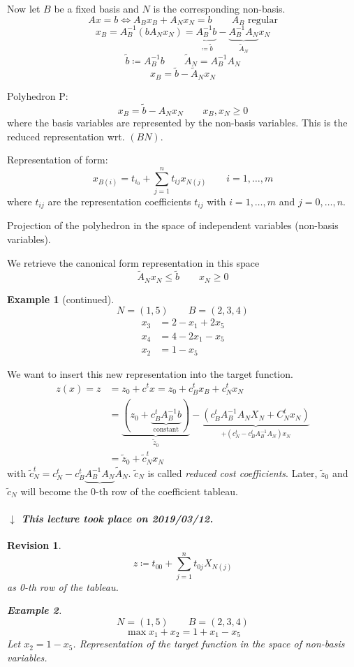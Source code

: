 \documentclass{article}
\numberwithin{lecref}{section}
\newtheorem*{Example}{Example}
\newtheorem*{Revision}{Revision}
\newcommand{\dateref}[1]{%
  \begin{mdframed}[backgroundcolor=gray!10,innerbottommargin=0pt,innertopmargin=0pt]
    \paragraph{\textit{$\downarrow$ This lecture took place on #1.}}%
  \end{mdframed}%
}
\begin{document}
Now let $B$ be a fixed basis and $N$ is the corresponding non-basis.
\[ Ax = b \iff A_B x_B + A_N x_N = b \qquad A_B \text{ regular} \]
\[ x_B = A_B^{-1} (b  A_N x_N) = \underbrace{A_B^{-1} b}_{\coloneqq \tilde b} - \underbrace{A_B^{-1} A_N}_{\tilde A_N} x_N \]
\[ \tilde b \coloneqq A_B^{-1} b \qquad \tilde A_N = A_B^{-1} A_N \]
\[ x_B = \tilde b - \tilde A_N x_N \]

Polyhedron P:
\[ x_B = \tilde b - A_N x_N \qquad x_B, x_N \geq 0 \]
where the basis variables are represented by the non-basis variables.
This is the reduced representation wrt. $(BN)$.

Representation of form:
\[ x_{B(i)} = t_{i_0} + \sum_{j=1}^n t_{ij} x_{N(j)} \qquad i = 1, \dots, m \]
where $t_{ij}$ are the representation coefficients $t_{ij}$ with $i = 1, \dots, m$ and $j = 0, \dots, n$.

Projection of the polyhedron in the space of independent variables (non-basis variables).

We retrieve the canonical form representation in this space
\[ \tilde A_N x_N \leq \tilde b \qquad x_N \geq 0 \]

\begin{Example}[continued]
	\[ N = (1, 5) \qquad B = (2, 3, 4) \]
	\begin{align*}
		x_3 &= 2 - x_1 + 2 x_5 \\
		x_4 &= 4 - 2x_1 - x_5 \\
		x_2 &= 1 - x_5
	\end{align*}
\end{Example}

We want to insert this new representation into the target function.
\begin{align*}
	z(x) = z
		&= z_0 + c^t x = z_0 + c_B^t x_B + c_N^t x_N \\
		&= \underbrace{(z_0 + \underbrace{c_B^t A_B^{-1} b}_{\text{constant}})}_{\tilde z_0} - \underbrace{(c_B^t A_B^{-1} A_N X_N + C_N^t x_N)}_{+ (c_N^t - c_B^t A_B^{-1} A_N) x_N} \\
		&= \tilde z_0 + \tilde c_N^t x_N
\end{align*}
with $\tilde c_N^t = c_N^t - c_B^t \underbrace{A_B^{-1} A_N}{\tilde A_N}$. $\tilde c_N$ is called \emph{reduced cost coefficients}. Later, $\tilde z_0$ and $\tilde c_N$ will become the 0-th row of the coefficient tableau.

\dateref{2019/03/12}

\begin{Revision}
	\[ z \coloneqq t_{00} + \sum_{j=1}^n t_{0j} X_{N(j)} \]
	as 0-th row of the tableau.
	\begin{Example}
		\[ N = (1, 5) \qquad B = (2, 3, 4) \]
		\[ \max x_1 + x_2 = 1 + x_1 - x_5 \]
		Let $x_2 = 1 - x_5$.
		Representation of the target function in the space of non-basis variables.
	\end{Example}
\end{Revision}
\end{document}

